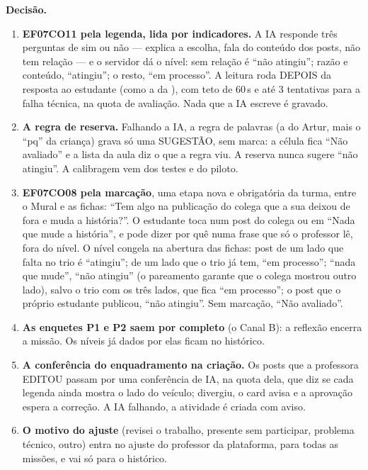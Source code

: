 \textbf{Decisão.}

\begin{enumerate}
  \item \textbf{EF07CO11 pela legenda, lida por indicadores.} A IA responde três
    perguntas de sim ou não --- explica a escolha, fala do conteúdo dos posts,
    não tem relação --- e o servidor dá o nível: sem relação é \enquote{não
    atingiu}; razão e conteúdo, \enquote{atingiu}; o resto, \enquote{em
    processo}. A leitura roda DEPOIS da resposta ao estudante (como a da
    ), com teto de 60\,s e até 3 tentativas para a falha técnica,
    na quota de avaliação. Nada que a IA escreve é gravado.
  \item \textbf{A regra de reserva.} Falhando a IA, a regra de palavras (a do
    Artur, mais o \enquote{pq} da criança) grava só uma SUGESTÃO, sem marca:
    a célula fica \enquote{Não avaliado} e a lista da aula diz o que a regra
    viu. A reserva nunca sugere \enquote{não atingiu}. A calibragem vem dos
    testes e do piloto.
  \item \textbf{EF07CO08 pela marcação}, uma etapa nova e obrigatória da turma,
    entre o Mural e as fichas: \enquote{Tem algo na publicação do colega que a
    sua deixou de fora e muda a história?}. O estudante toca num post do
    colega ou em \enquote{Nada que mude a história}, e pode dizer por quê numa
    frase que só o professor lê, fora do nível. O nível congela na abertura das
    fichas: post de um lado que falta no trio é \enquote{atingiu}; de um lado
    que o trio já tem, \enquote{em processo}; \enquote{nada que mude},
    \enquote{não atingiu} (o pareamento garante que o colega mostrou outro
    lado), salvo o trio com os três lados, que fica \enquote{em processo}; o
    post que o próprio estudante publicou, \enquote{não atingiu}. Sem marcação,
    \enquote{Não avaliado}.
  \item \textbf{As enquetes P1 e P2 saem por completo} (o Canal B): a reflexão
    encerra a missão. Os níveis já dados por elas ficam no histórico.
  \item \textbf{A conferência do enquadramento na criação.} Os posts que a
    professora EDITOU passam por uma conferência de IA, na quota dela, que diz
    se cada legenda ainda mostra o lado do veículo; divergiu, o card avisa e a
    aprovação espera a correção. A IA falhando, a atividade é criada com aviso.
  \item \textbf{O motivo do ajuste} (revisei o trabalho, presente sem
    participar, problema técnico, outro) entra no ajuste do professor da
    plataforma, para todas as missões, e vai só para o histórico.
\end{enumerate}

